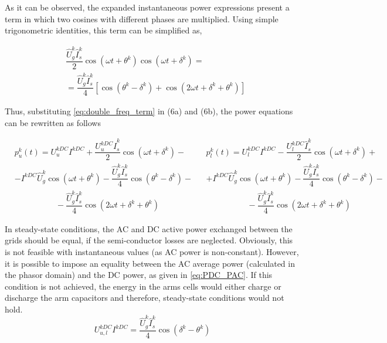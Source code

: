 \documentclass[journal]{IEEEtran}
\begin{document}
As it can be observed, the expanded instantaneous power expressions present a term in which two cosines with different phases are multiplied. Using simple trigonometric identities, this term can be simplified as, 

\begin{equation}
\begin{aligned}
&\dfrac{\hat{U}_g^k \hat{I}_s^k}{2}\cos(\omega t + \theta^k) \cos(\omega t + \delta^k ) = \\& = \dfrac{\hat{U}_g^k \hat{I}_s^k}{4} \left[\cos(\theta^k - \delta^k) + \cos(2\omega t + \delta^k + \theta^k)\right]
\end{aligned}  
\label{eq:double_freq_term}
\end{equation}  

Thus, substituting \eqref{eq:double_freq_term} in (6a) and (6b), the power equations can be rewritten as follows

\begin{subequations}
\begin{align}
&p_u^{k}(t) = U_u^{kDC}I^{kDC} + \dfrac{U_u^{kDC}\hat{I}_s^k}{2} \cos(\omega t + \delta^k ) -  \\ & - I^{kDC}\hat{U}_g^k \cos(\omega t + \theta^k) - \dfrac{\hat{U}_g^k \hat{I}_s^k}{4}\cos(\theta^k - \delta^k) - \nonumber \\ 
& \qquad\qquad\quad - \dfrac{\hat{U}_g^k \hat{I}_s^k}{4}\cos(2\omega t + \delta^k + \theta^k) \nonumber
\label{eq:u_arm_power_simplified}
\end{align}    
\begin{align}
&p_l^{k}(t) = U_l^{kDC}I^{kDC} - \dfrac{U_l^{kDC}\hat{I}_s^k}{2} \cos(\omega t + \delta^k ) + \\ & + I^{kDC}\hat{U}_g^k \cos(\omega t + \theta^k) - \dfrac{\hat{U}_g^k \hat{I}_s^k}{4}\cos(\theta^k - \delta^k) - \nonumber \\ 
& \qquad\qquad\quad - \dfrac{\hat{U}_g^k\hat{I}_s^k}{4}\cos(2\omega t + \delta^k + \theta^k) \nonumber
\label{eq:lower_arm_power_simplified}
\end{align}
\end{subequations}

In steady-state conditions, the AC and DC active power exchanged between the grids should be equal, if the semi-conductor losses are neglected. Obviously, this is not feasible with instantaneous values (as AC power is non-constant). However, it is possible to impose an equality between the AC average power (calculated in the phasor domain) and the DC power, as given in \eqref{eq:PDC_PAC}. If this condition is not achieved, the energy in the arms cells would either charge or discharge the arm capacitors and therefore, steady-state conditions would not hold.
~
\begin{equation}
 U_{u,l}^{kDC}I^{kDC}  = \dfrac{\hat{U}_g^k \hat{I}_s^k}{4}\cos(\delta^k - \theta^k)
\label{eq:PDC_PAC}
\end{equation}  
\end{document}
